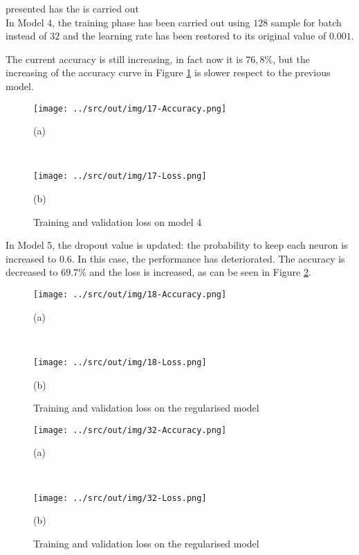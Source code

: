 \documentclass[a4paper,12pt]{article} %
\begin{document}
presented has  the  
is carried out 
\\
	
	In Model 4, the training phase has been carried out using $128$ sample for 
	batch instead of $32$ and the learning rate has been restored to its 
	original value of $0.001$. 
	
	The current accuracy is still increasing, in fact now it is $76,8\%$, but 
	the increasing of the accuracy curve in Figure \ref{fig:model4-performance} 
	is slower respect to the previous model.
	
	\begin{figure}[htb]
		\begin{minipage}[c]{.49\textwidth}
			\centering
			\texttt{[image: ../src/out/img/17-Accuracy.png]}
			\caption*{(a)}
		\end{minipage}
		~
		\begin{minipage}[c]{.49\textwidth}
			\centering
			\texttt{[image: ../src/out/img/17-Loss.png]}
			\caption*{(b)}
		\end{minipage}
		\caption{Training and validation loss on model 4}
		\label{fig:model4-performance}
	\end{figure}
	
	In Model 5, the dropout value is updated: the probability to keep each 
	neuron is increased to $0.6$.
	In this case, the performance has deteriorated. The accuracy is decreased 
	to $69.7\%$ and the loss is increased, as can be seen in Figure 
	\ref*{fig:model5-performance}.
	
	\begin{figure}[htb]
		\begin{minipage}[c]{.49\textwidth}
			\centering
			\texttt{[image: ../src/out/img/18-Accuracy.png]}
			\caption*{(a)}
		\end{minipage}
		~
		\begin{minipage}[c]{.49\textwidth}
			\centering
			\texttt{[image: ../src/out/img/18-Loss.png]}
			\caption*{(b)}
		\end{minipage}
		\caption{Training and validation loss on the regularised model}
		\label{fig:model5-performance}
	\end{figure}
	
		
	\begin{figure}[htb]
		\begin{minipage}[c]{.49\textwidth}
			\centering
			\texttt{[image: ../src/out/img/32-Accuracy.png]}
			\caption*{(a)}
		\end{minipage}
		~
		\begin{minipage}[c]{.49\textwidth}
			\centering
			\texttt{[image: ../src/out/img/32-Loss.png]}
			\caption*{(b)}
		\end{minipage}
		\caption{Training and validation loss on the regularised model}
		\label{fig:model6-performance}
	\end{figure}
	
\end{document}
